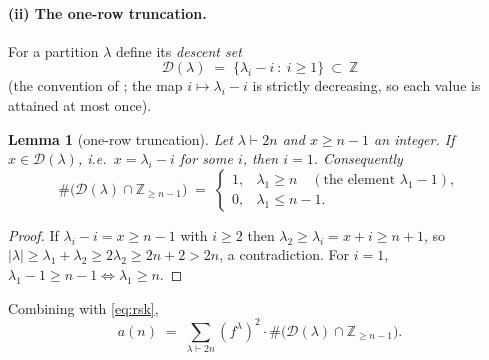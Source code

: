\documentclass[11pt]{article}
\theoremstyle{plain}
\newtheorem{lemma}[theorem]{Lemma}
\theoremstyle{definition}
\theoremstyle{remark}
\newcommand{\Dset}{\mathcal{D}}
\newcommand{\ZZ}{\mathbb{Z}}
\begin{document}
\paragraph{(ii) The one-row truncation.} For a partition $\lambda$ define its \emph{descent set}
\[
  \Dset(\lambda)\;=\;\{\lambda_i-i\ :\ i\ge1\}\ \subset\ \ZZ
\]
(the convention of \cite[\S1.2]{BOO00}; the map $i\mapsto\lambda_i-i$ is strictly decreasing, so
each value is attained at most once).

\begin{lemma}[one-row truncation]\label{lem:trunc}
Let $\lambda\vdash 2n$ and $x\ge n-1$ an integer. If $x\in\Dset(\lambda)$, i.e.\
$x=\lambda_i-i$ for some $i$, then $i=1$. Consequently
\[
  \#\bigl(\Dset(\lambda)\cap\ZZ_{\ge n-1}\bigr)\;=\;
  \begin{cases} 1, & \lambda_1\ge n \quad(\text{the element } \lambda_1-1),\\
                0, & \lambda_1\le n-1. \end{cases}
\]
\end{lemma}

\begin{proof}
If $\lambda_i-i=x\ge n-1$ with $i\ge2$ then $\lambda_2\ge\lambda_i=x+i\ge n+1$, so
$|\lambda|\ge\lambda_1+\lambda_2\ge 2\lambda_2\ge 2n+2>2n$, a contradiction. For $i=1$,
$\lambda_1-1\ge n-1\iff\lambda_1\ge n$.
\end{proof}

Combining with \eqref{eq:rsk},
\begin{equation}\label{eq:count}
  a(n)\;=\;\sum_{\lambda\vdash 2n}(f^\lambda)^2\cdot
           \#\bigl(\Dset(\lambda)\cap\ZZ_{\ge n-1}\bigr).
\end{equation}
\end{document}
